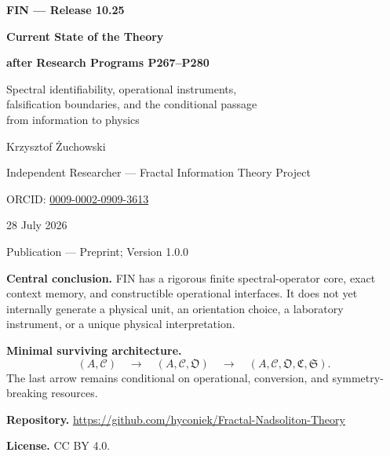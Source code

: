 \documentclass[11pt,a4paper,openany]{report}
\begin{document}
\hypersetup{pageanchor=false}
\begin{titlepage}
\centering
\vspace*{8mm}
{\Large\bfseries FIN --- Release 10.25\par}
\vspace{10mm}
{\Huge\bfseries Current State of the Theory\par}
\vspace{4mm}
{\LARGE\bfseries after Research Programs P267--P280\par}
\vspace{7mm}
{\Large Spectral identifiability, operational instruments,\\
falsification boundaries, and the conditional passage\\
from information to physics\par}
\vspace{15mm}
{\Large Krzysztof \.Zuchowski\par}
\vspace{2mm}
{\normalsize Independent Researcher --- Fractal Information Theory Project\par}
\vspace{2mm}
{\normalsize ORCID:
\href{https://orcid.org/0009-0002-0909-3613}{0009-0002-0909-3613}\par}
\vspace{8mm}
{\large 28 July 2026\par}
{\normalsize Publication --- Preprint; Version 1.0.0\par}
\vfill
\begin{minipage}{0.91\textwidth}
\small
\textbf{Central conclusion.}
FIN has a rigorous finite spectral-operator core, exact context memory, and
constructible operational interfaces. It does not yet internally generate a
physical unit, an orientation choice, a laboratory instrument, or a unique
physical interpretation.

\medskip
\textbf{Minimal surviving architecture.}
\[
(A,\mathcal C)
\quad\longrightarrow\quad
(A,\mathcal C,\mathfrak O)
\quad\longrightarrow\quad
(A,\mathcal C,\mathfrak O,\mathfrak C,\mathfrak S).
\]
The last arrow remains conditional on operational, conversion, and
symmetry-breaking resources.

\medskip
\textbf{Repository.}
\url{https://github.com/hyconiek/Fractal-Nadsoliton-Theory}

\textbf{License.} CC BY 4.0.
\end{minipage}
\vfill
\end{titlepage}
\hypersetup{pageanchor=true}
\end{document}

